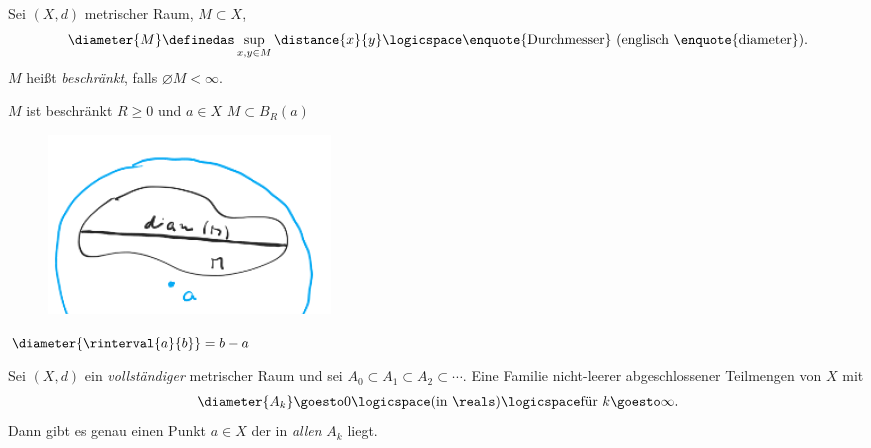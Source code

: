\begin{definition}
    Sei \( (X,d)\) metrischer Raum, \( M\subset X\),
    \begin{align*}
        \diameter{M}\definedas \sup_{x,y\in M}\distance{x}{y}\logicspace \text{\enquote{Durchmesser} (englisch \enquote{diameter})}.
    \end{align*}
    \( M \) heißt \emph{beschränkt}, falls \( \diameter{M}<\infty \).
\end{definition}
\begin{bemerkung*}
    \( M\) ist beschränkt \tiff \texists \( R\geq 0\)  und \( a\in X\) \sd \( M\subset B_R(a)\) 
    \begin{figure}[H]
        \centering
        \includegraphics[width=0.5\linewidth]{figures/beschraenkte_menge_in_ball}
        \label{fig:beschraenkte_menge_in_ball}
    \end{figure}   
\end{bemerkung*}
\begin{beispiel*}
    \( \diameter{\rinterval{a}{b}}=b-a\)
\end{beispiel*}
\begin{satz}[Schachtelungsprinzip]
    Sei \( (X,d)\) ein \emph{vollständiger} metrischer Raum und sei \( A_0\subset A_1\subset A_2\subset \cdots\).
    Eine Familie nicht-leerer abgeschlossener Teilmengen von \( X\) mit
    \begin{align*}
        \diameter{A_k}\goesto 0 \logicspace (\text{in }\reals)\logicspace \text{für } k\goesto \infty. 
    \end{align*} 
    Dann gibt es genau einen Punkt \( a\in X\) der in \emph{allen} \( A_k\) liegt.
\end{satz}
